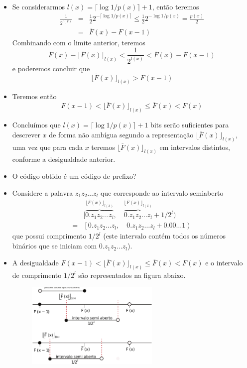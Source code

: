 \begin{frame}[allowframebreaks]
\begin{itemize}
  \item Se considerarmos $l(x) = \lceil \log 1/p(x) \rceil + 1$, então teremos
	\begin{eqnarray}
	\frac{1}{2^{l(x)}} &=& \frac{1}{2} 2^{- \lceil \log 1/p(x) \rceil} \leq \frac{1}{2} 2^{-\log 1/p(x)} = \frac{p(x)}{2} \\	
			&=& \overline{F}(x) - F(x-1)
	\end{eqnarray}
	Combinando com o limite anterior, teremos
	\begin{equation}
	\overline{F}(x) - \lfloor \overline{F}(x) \rfloor_{l(x)} < \frac{1}{2^{l(x)}} < \overline{F}(x) - F(x-1)
	\end{equation}
	e poderemos concluir que
	\begin{equation}
	\lfloor \overline{F}(x) \rfloor_{l(x)} > F(x-1)
	\end{equation}
  \item Teremos então
	\begin{equation}
	F(x-1) < \lfloor \overline{F}(x) \rfloor_{l(x)} \leq \overline{F}(x) < F(x)
	\end{equation}
  \item Concluímos que $l(x) = \lceil \log 1/p(x) \rceil + 1$ bits serão suficientes para descrever $x$ de forma não ambígua 
	segundo a representação $\lfloor \overline{F}(x) \rfloor_{l(x)}$, uma vez
	que para cada $x$ teremos $\lfloor \overline{F}(x) \rfloor_{l(x)}$ em intervalos distintos, conforme a desigualdade anterior.
  \item O código obtido é um código de prefixo?
  \item Considere a palavra $z_1 z_2 \ldots z_l$ que corresponde ao intervalo semiaberto 
	\begin{eqnarray}
	  & [ \overbrace{0.z_1 z_2 \ldots z_l}^{\lfloor \overline{F}(x) \rfloor_{l(x)}} , \quad \overbrace{0.z_1 z_2 \ldots z_l}^{\lfloor \overline{F}(x) \rfloor_{l(x)}} + 1/2^l  ) \\
	 =& \left[ 0.z_1 z_2 \ldots z_l , \quad 0.z_1 z_2 \ldots z_l + 0.00\ldots 1  \right) 
	\end{eqnarray}
	que possui comprimento $1/2^l$ (este intervalo contém todos os números binários que se iniciam com $0.z_1 z_2 \ldots z_l$).
  \item A desigualdade $F(x-1) < \lfloor \overline{F}(x) \rfloor_{l(x)} \leq \overline{F}(x) < F(x)$ e o intervalo de comprimento $1/2^l$ são representados na figura abaixo.
        \begin{figure}[h!]
        \centering
        \includegraphics[width=0.6\textwidth]{images/intervalshannonfanoelias.pdf}
        \label{fig:intervalshannonfanoelias}
        \end{figure}


\end{itemize}
\end{frame}
